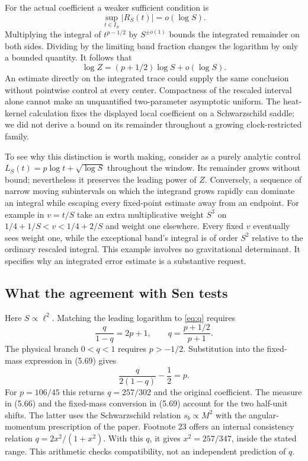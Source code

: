 \documentclass[11pt]{article}
\begin{document}
For the actual coefficient a weaker sufficient condition is
\begin{equation}\label{eq:rem}
 \sup_{t\in I_S}|R_S(t)|=o(\log S).
\end{equation}
Multiplying the integral of $t^{p-1/2}$ by $S^{\pm o(1)}$ bounds the integrated remainder on both sides. Dividing by the limiting band fraction changes the logarithm by only a bounded quantity. It follows that
\[
 \log Z=(p+1/2)\log S+o(\log S).
\]
An estimate directly on the integrated trace could supply the same conclusion without pointwise control at every center. Compactness of the rescaled interval alone cannot make an unquantified two-parameter asymptotic uniform. The heat-kernel calculation fixes the displayed local coefficient on a Schwarzschild saddle; we did not derive a bound on its remainder throughout a growing clock-restricted family.

To see why this distinction is worth making, consider as a purely analytic control $L_S(t)=p\log t+\sqrt{\log S}$ throughout the window. Its remainder grows without bound; nevertheless it preserves the leading power of $Z$. Conversely, a sequence of narrow moving subintervals on which the integrand grows rapidly can dominate an integral while escaping every fixed-point estimate away from an endpoint. For example in $v=t/S$ take an extra multiplicative weight $S^3$ on $1/4+1/S<v<1/4+2/S$ and weight one elsewhere. Every fixed $v$ eventually sees weight one, while the exceptional band's integral is of order $S^2$ relative to the ordinary rescaled integral. This example involves no gravitational determinant. It specifies why an integrated error estimate is a substantive request.

\subsection{What the agreement with Sen tests}
Here $S\propto\ell^2$. Matching the leading logarithm to \eqref{eq:q} requires
\[
 \frac{q}{1-q}=2p+1,\qquad q=\frac{p+1/2}{p+1}.
\]
The physical branch $0<q<1$ requires $p>-1/2$. Substitution into the fixed-mass expression in (5.69) gives
\begin{equation}\label{eq:coef}
 \frac{q}{2(1-q)}-\frac12=p.
\end{equation}
For $p=106/45$ this returns $q=257/302$ and the original coefficient. The measure in (5.66) and the fixed-mass conversion in (5.69) account for the two half-unit shifts. The latter uses the Schwarzschild relation $s_b\propto M^2$ with the angular-momentum prescription of the paper. Footnote 23 offers an internal consistency relation $q=2x^2/(1+x^2)$. With this $q$, it gives $x^2=257/347$, inside the stated range. This arithmetic checks compatibility, not an independent prediction of $q$.
\end{document}
